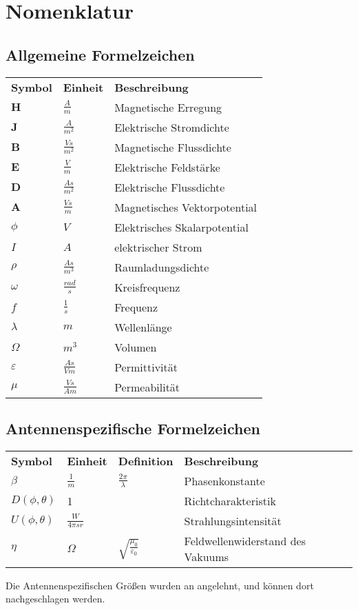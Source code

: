 \newpage
\section*{Nomenklatur}

\subsection*{Allgemeine Formelzeichen}


\FloatBarrier
\begin{longtable}[l]{p{70pt} p{80pt} p{200pt}}
 \textbf{Symbol}	& \textbf{Einheit} & \textbf{Beschreibung} \\
 $\mathbf{H}$	& $\frac{A}{m}$	& Magnetische Erregung\\
 $\mathbf{J}$	& $\frac{A}{m^2}$	& Elektrische Stromdichte\\
 $\mathbf{B}$	& $\frac{Vs}{m^2}$	& Magnetische Flussdichte\\
 $\mathbf{E}$	& $\frac{V}{m}$	& Elektrische Feldst\"arke\\
 $\mathbf{D}$	& $\frac{As}{m^2}$	& Elektrische Flussdichte\\
 $\mathbf{A}$	& $\frac{Vs}{m}$	& Magnetisches Vektorpotential\\
 $\phi$	& $V$	& Elektrisches Skalarpotential\\
 $I$	& $A$	& elektrischer Strom\\
 $\rho$	& $\frac{As}{m^3}$	& Raumladungsdichte\\
 $\omega$	& $\frac{rad}{s}$	& Kreisfrequenz\\
 $f$	& $\frac{1}{s}$	& Frequenz\\
 $\lambda$	& $m$	& Wellenl\"ange\\
 $\Omega$	& $m^3$	& Volumen\\
 $\varepsilon$	& $\frac{As}{Vm}$	& Permittivit\"at\\
 $\mu$	& $\frac{Vs}{Am}$	& Permeabilit\"at
\end{longtable}
\FloatBarrier
\subsection*{Antennenspezifische Formelzeichen}
\FloatBarrier
\begin{longtable}[l]{p{70pt} p{80pt} p{80pt} p{200pt}}
 \textbf{Symbol}	& \textbf{Einheit}& \textbf{Definition} & \textbf{Beschreibung} \\
 $\beta$	& $\frac{1}{m}$	& $\frac{2\pi}{\lambda}$ & Phasenkonstante\\
 $D(\phi,\theta)$	& 1	&  & Richtcharakteristik\\
 $U(\phi,\theta)$	& $\frac{W}{4\pi sr}$	&  & Strahlungsintensität\\
 $\eta$	& $\Omega$	& $\sqrt{\frac{\mu_0}{\varepsilon_0}}$ & Feldwellenwiderstand des Vakuums
\end{longtable}
Die Antennenspezifischen Größen wurden an \cite{balanis} angelehnt, und können dort nachgeschlagen werden.
\FloatBarrier
